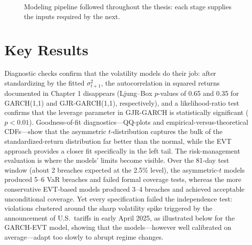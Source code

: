\documentclass[11pt, oneside]{book}
\numberwithin{equation}{chapter}
\numberwithin{table}{chapter}
\begin{document}
\begin{figure}[H]
\centering
{}
\caption*{Modeling pipeline followed throughout the thesis: each stage supplies the inputs required by the next.}
\end{figure}

\section*{Key Results}

Diagnostic checks confirm that the volatility models do their job: after standardizing by the fitted $\sigma_{t+1}^2$, the autocorrelation in squared returns documented in Chapter 1 disappears (Ljung--Box $p$-values of 0.65 and 0.35 for GARCH(1,1) and GJR-GARCH(1,1), respectively), and a likelihood-ratio test confirms that the leverage parameter in GJR-GARCH is statistically significant ($p<0.01$). Goodness-of-fit diagnostics—QQ-plots and empirical-versus-theoretical CDFs—show that the asymmetric $t$-distribution captures the bulk of the standardized-return distribution far better than the normal, while the EVT approach provides a closer fit specifically in the left tail.
\newpage
The risk-management evaluation is where the models' limits become visible. Over the 81-day test window (about 2 breaches expected at the 2.5\% level), the asymmetric-$t$ models produced 5--6 VaR breaches and failed formal coverage tests, whereas the more conservative EVT-based models produced 3--4 breaches and achieved acceptable unconditional coverage. Yet every specification failed the independence test: violations clustered around the sharp volatility spike triggered by the announcement of U.S.\ tariffs in early April 2025, as illustrated below for the GARCH-EVT model, showing that the models—however well calibrated on average—adapt too slowly to abrupt regime changes.
\end{document}
